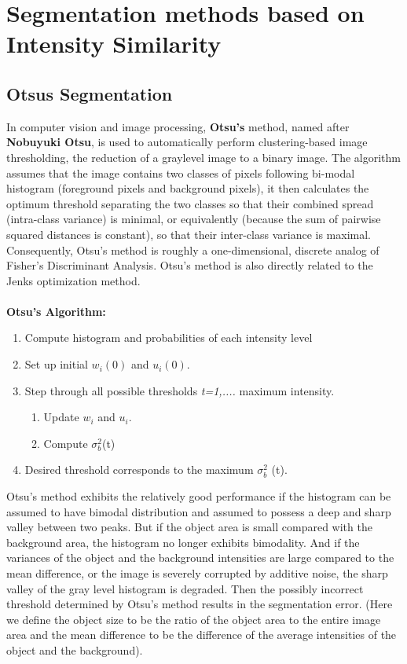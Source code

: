 \chapter{Segmentation methods based on Intensity Similarity}
\section{Otsus Segmentation}
In computer vision and image processing, \textbf{Otsu's} method, named after \textbf{Nobuyuki Otsu}, is used to automatically perform clustering-based image thresholding, the reduction of a graylevel image to a binary image. The algorithm assumes that the image contains two classes of pixels following bi-modal histogram (foreground pixels and background pixels), it then calculates the optimum threshold separating the two classes so that their combined spread (intra-class variance) is minimal, or equivalently (because the sum of pairwise squared distances is constant), so that their inter-class variance is maximal. Consequently, Otsu's method is roughly a one-dimensional, discrete analog of Fisher's Discriminant Analysis. Otsu's method is also directly related to the Jenks optimization method.
\\
\\
\textbf{Otsu's Algorithm:}
\begin{enumerate}
\item Compute histogram and probabilities of each intensity level
\item Set up initial $w_i(0)$ and $u_i(0)$.
\item Step through all possible thresholds \textit{t=1,....}  maximum intensity.
  \begin{enumerate}
  \item Update $w_i$ and $u_i$.
  \item Compute $\sigma_{b}^{2}$(t)
  \end{enumerate}
\item Desired threshold corresponds to the maximum $\sigma_{b}^{2}$ (t).
\end{enumerate}

Otsu’s method exhibits the relatively good performance if the histogram can be assumed to have bimodal distribution and assumed to possess a deep and sharp valley between two peaks. But if the object area is small compared with the background area, the histogram no longer exhibits bimodality. And if the variances of the object and the background intensities are large compared to the mean difference, or the image is severely corrupted by additive noise, the sharp valley of the gray level histogram is degraded. Then the possibly incorrect threshold determined by Otsu’s method results in the segmentation error. (Here we define the object size to be the ratio of the object area to the entire image area and the mean difference to be the difference of the average intensities of the object and the background).

